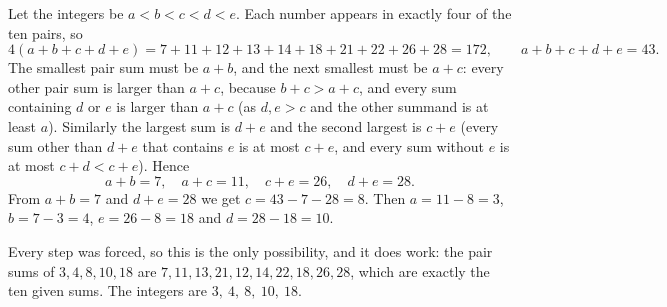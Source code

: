Let the integers be $a<b<c<d<e$. Each number appears in exactly four of the ten pairs, so
\[
4(a+b+c+d+e)=7+11+12+13+14+18+21+22+26+28=172,\qquad a+b+c+d+e=43 .
\]
The smallest pair sum must be $a+b$, and the next smallest must be $a+c$: every other pair sum is larger than $a+c$, because $b+c>a+c$, and every sum containing $d$ or $e$ is larger than $a+c$ (as $d,e>c$ and the other summand is at least $a$). Similarly the largest sum is $d+e$ and the second largest is $c+e$ (every sum other than $d+e$ that contains $e$ is at most $c+e$, and every sum without $e$ is at most $c+d<c+e$). Hence
\[
a+b=7,\quad a+c=11,\quad c+e=26,\quad d+e=28 .
\]
From $a+b=7$ and $d+e=28$ we get $c=43-7-28=8$. Then $a=11-8=3$, $b=7-3=4$, $e=26-8=18$ and $d=28-18=10$.

Every step was forced, so this is the only possibility, and it does work: the pair sums of $3,4,8,10,18$ are $7,11,13,21,12,14,22,18,26,28$, which are exactly the ten given sums. The integers are $\boxed{3,\ 4,\ 8,\ 10,\ 18}$.
